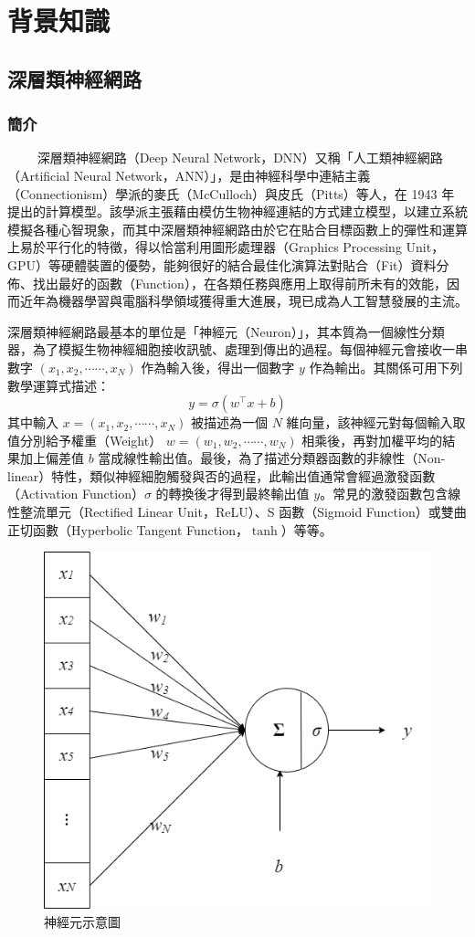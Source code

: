 
\chapter{背景知識}
\section{深層類神經網路}

\subsection{簡介}

　　
深層類神經網路（Deep Neural Network，DNN）又稱「人工類神經網路（Artificial Neural Network，ANN）」，是由神經科學中連結主義（Connectionism）學派的麥氏（McCulloch）與皮氏（Pitts）等人，在 1943 年 \cite{mcculloch_logical_1943} 提出的計算模型。該學派主張藉由模仿生物神經連結的方式建立模型，以建立系統模擬各種心智現象，而其中深層類神經網路由於它在貼合目標函數上的彈性和運算上易於平行化的特徵，得以恰當利用圖形處理器（Graphics Processing Unit，GPU）等硬體裝置的優勢，能夠很好的結合最佳化演算法對貼合（Fit）資料分佈、找出最好的函數（Function），在各類任務與應用上取得前所未有的效能，因而近年為機器學習與電腦科學領域獲得重大進展，現已成為人工智慧發展的主流。

深層類神經網路最基本的單位是「神經元（Neuron）」，其本質為一個線性分類器，為了模擬生物神經細胞接收訊號、處理到傳出的過程。每個神經元會接收一串數字 \((x_1, x_2, \cdots\cdots, x_N)\) 作為輸入後，得出一個數字 \(y\) 作為輸出。其關係可用下列數學運算式描述：
$$y=\sigma(w^\top x + b) $$
其中輸入 $x = (x_1, x_2, \cdots\cdots, x_N)$ 被描述為一個 $N$ 維向量，該神經元對每個輸入取值分別給予權重（Weight） $w = (w_1, w_2, \cdots\cdots, w_N)$ 相乘後，再對加權平均的結果加上偏差值 $b$ 當成線性輸出值。最後，為了描述分類器函數的非線性（Non-linear）特性，類似神經細胞觸發與否的過程，此輸出值通常會經過激發函數（Activation Function）$\sigma$ 的轉換後才得到最終輸出值 $y$。常見的激發函數包含線性整流單元（Rectified Linear Unit，ReLU）、S 函數（Sigmoid Function）或雙曲正切函數（Hyperbolic Tangent Function，$\tanh$）等等。


\begin{figure}
    \centering
    \includegraphics[width=0.5\linewidth]{figures/neuron.drawio.png}
    \caption{神經元示意圖}
    \label{fig:single-neuron}
\end{figure}

